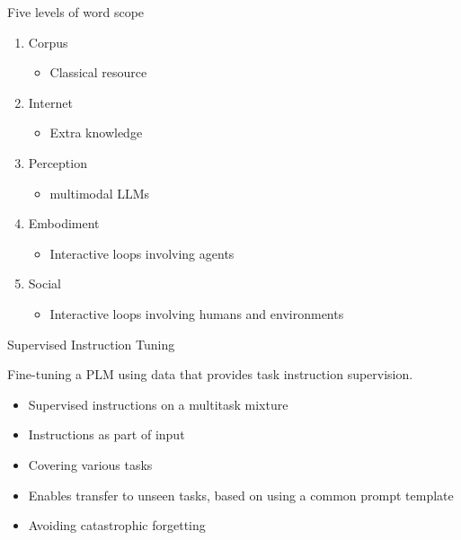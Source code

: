 
\begin{vbframe}{Five levels of word scope}

\vfill

\begin{enumerate}

    \item Corpus
        \begin{itemize}
        \item Classical resource
        \end{itemize}

    \item Internet 
        \begin{itemize}
        \item Extra knowledge
        \end{itemize}

    \item Perception 
        \begin{itemize}
        \item multimodal LLMs
        \end{itemize}

    \item Embodiment 
        \begin{itemize}
        \item Interactive loops involving agents
        \end{itemize}

    \item Social 
        \begin{itemize}
        \item Interactive loops involving humans and environments
        \end{itemize}

\end{enumerate}

\vfill

\end{vbframe}


\begin{vbframe}{Supervised Instruction Tuning}

\vfill

Fine-tuning a PLM using data that provides task instruction supervision. \vskip3mm
\begin{itemize}
\item Supervised instructions on a multitask mixture
\item Instructions as part of input
\item Covering various tasks 
\item Enables transfer to unseen tasks, based on using a
common prompt template
\item Avoiding catastrophic forgetting
\end{itemize}

\vfill

\end{vbframe}

